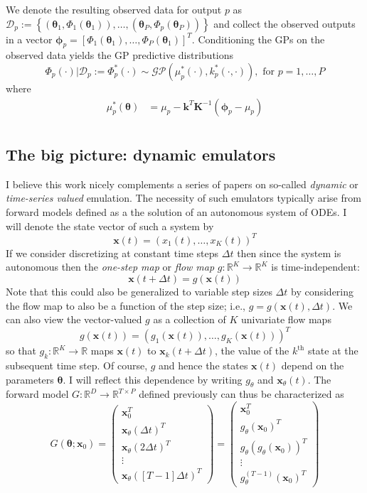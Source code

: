 \documentclass[12pt]{article}
\newcommand{\R}{\mathbb{R}}
\newcommand{\btheta}{\boldsymbol{\theta}}
\newcommand{\bx}{\mathbf{x}}
\begin{document}
We denote the resulting observed data for output $p$ as 
$\mathcal{D}_p := \left\{(\btheta_1, \Phi_1(\btheta_1)), \dots, (\btheta_P, \Phi_p(\btheta_P))  \right\}$ and collect the observed outputs in a vector 
$\boldsymbol{\phi}_p = \left[\Phi_1(\btheta_1), \dots, \Phi_P(\btheta_1) \right]^T$. Conditioning the GPs on the observed data yields the GP predictive distributions 
\[\Phi_p(\cdot)|\mathcal{D}_p := \Phi_p^*(\cdot) \sim \mathcal{GP}(\mu^*_p(\cdot), k_p^*(\cdot, \cdot)), \text{ for } p = 1, \dots, P\]
where 
\begin{align*}
\mu_p^*(\btheta) &= \mu_p  - \mathbf{k}^T \mathbf{K}^{-1} \left(\boldsymbol{\phi}_p - \mu_p \right) \\
\end{align*}

\subsection{The big picture: dynamic emulators}
I believe this work nicely complements a series of papers on so-called \textit{dynamic} or \textit{time-series valued} emulation. The necessity of such emulators typically arise from forward models 
defined as a the solution of an autonomous system of ODEs. I will denote the state vector of such a system by 
\[\bx(t) = \left(x_1(t), \dots, x_K(t) \right)^T \]
If we consider discretizing at constant time steps $\Delta t$ then since the system is autonomous then the \textit{one-step map} or \textit{flow map} $g: \R^K \to \R^K$ is time-independent: 
 \[\bx(t + \Delta t) = g(\bx(t))\]
 Note that this could also be generalized to variable step sizes $\Delta t$ by considering the flow map to also be a function of the step size; i.e., $g = g(\bx(t), \Delta t)$. We can also view the 
 vector-valued $g$ as a collection of $K$ univariate flow maps
 \[g(\bx(t)) = \left(g_1(\bx(t)), \dots, g_K(\bx(t)) \right)^T\]
 so that $g_k: \R^K \to \R$ maps $\bx(t)$ to $\bx_k(t + \Delta t)$, the value of the $k^{\text{th}}$ state at the subsequent time step. Of course, $g$ and hence the states $\bx(t)$ depend on 
 the parameters $\btheta$. I will reflect this dependence by writing $g_\theta$ and $\bx_\theta(t)$. The forward model $G: \R^D \to \R^{T \times P}$ defined previously can thus be characterized 
 as 
 \[
 G(\btheta; \bx_0) = \begin{pmatrix} \bx_0^T \\ \bx_\theta(\Delta t)^T \\  \bx_\theta(2\Delta t)^T \\ \vdots \\ \bx_\theta\left([T-1]\Delta t\right)^T \end{pmatrix} = 
 \begin{pmatrix} \bx_0^T \\ g_\theta(\bx_0)^T \\  g_\theta\left(g_\theta(\bx_0)\right)^T \\ \vdots \\ g_\theta^{(T-1)}(\bx_0)^T \end{pmatrix}
 \]
\end{document}
